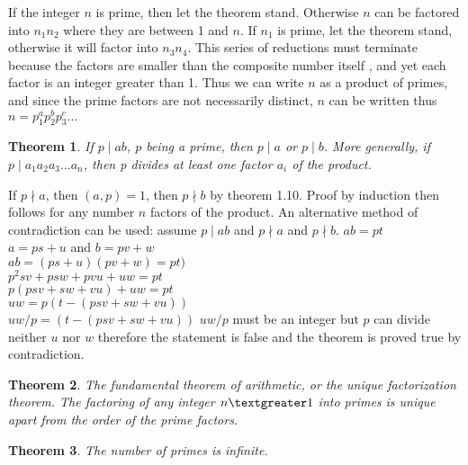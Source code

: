 \documentclass[11pt]{article} %
\newtheorem{theorem}{Theorem}[section]
\newenvironment{proof}[1][Proof]{\begin{trivlist}
\item[\hskip \labelsep {\bfseries #1}]}{\end{trivlist}}
\begin{document}
\begin{proof}
	If the integer $n$ is prime, then let the theorem stand. Otherwise $n$ can be factored into $n_1n_2$ where they are between 1 and $n$. If $n_1$ is prime, let the theorem stand, otherwise it will factor into $n_3n_4$. This series of reductions must terminate because the factors are smaller than the composite number itself , and yet each factor is an integer greater than 1. Thus we can write $n$ as a product of primes, and since the prime factors are not necessarily distinct, $n$ can be written thus
	{\center
		$n = p_1^a p_2^b p_3^c \ldots $ 
	\\
	}
\end{proof}

\begin{theorem}
	If $p \mid ab$, $p$ being a prime, then  $p \mid a$ or $p \mid b$. More generally, if $p \mid a_1a_2a_3\ldots$$a_n$, then p divides at least one factor $a_i$ of the product. 
\end{theorem}

\begin{proof}
	If $p \nmid a$, then $(a, p) = 1$, then $p \nmid b$ by theorem 1.10. Proof by induction then follows for any number $n$ factors of the product. An alternative method of contradiction can be used:
assume $p \mid ab $ and $p \nmid a$ and $p \nmid b$. 
	{\center
		$ab = pt$ 
		\\ $a = ps + u$ and $b = pv + w$ 
		\\ $ab = (ps + u)(pv + w) = pt) $
		\\ $p^2sv + psw + pvu + uw = pt $
		\\ $p(psv + sw + vu) + uw = pt$ 
		\\$uw = p(t - (psv + sw + vu)) $
		\\$uw/p = (t - (psv + sw + vu))$
	}
$uw / p$ must be an integer but $p$ can divide neither $u$ nor $w$ therefore the statement is false and the theorem is proved true by contradiction.
	
\end{proof}

\begin{theorem}
	The fundamental theorem of arithmetic, or the unique factorization theorem. The factoring of any integer $n \textgreater 1$ into primes is unique apart from the order of the prime factors. 
\end{theorem}

\begin{theorem}
	The number of primes is infinite. 
\end{theorem}
\end{document}
